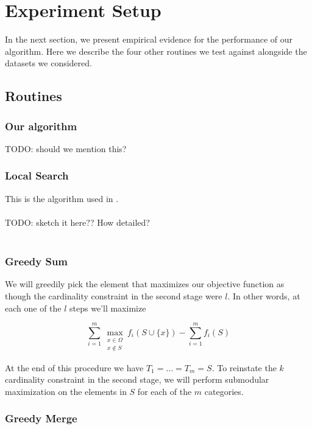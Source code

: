 \section{Experiment Setup}
\label{sec::exp_setup}

In the next section, we present empirical evidence for the performance of our algorithm. Here we describe the four other routines we test against alongside the datasets we considered. 

\subsection{Routines}

\subsubsection{Our algorithm}

TODO: should we mention this?

\subsubsection{Local Search}

This is the algorithm used in \cite{balkanski16learning}. \\
\\
TODO: sketch it here?? How detailed? \\
\\

\subsubsection{Greedy Sum}

We will greedily pick the element that maximizes our objective function as though the cardinality constraint in the second stage were $l$. In other words, at each one of the $l$ steps we'll maximize

$$
\sum_{i = 1}^{m} \max_{\substack{x \in \Omega \\ x \notin S }} f_i(S \cup \{ x \}) -
\sum_{i = 1}^{m} f_i(S)
$$

At the end of this procedure we have $T_1 = \dots = T_m = S$. To reinstate the $k$ cardinality constraint in the second stage, we will perform submodular maximization on the elements in $S$ for each of the $m$ categories. 

\subsubsection{Greedy Merge}

